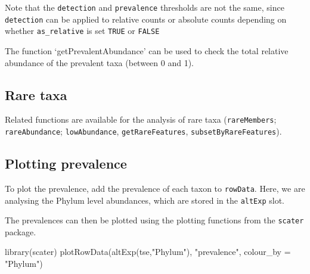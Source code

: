 \documentclass[
]{book}
\newenvironment{Shaded}{\begin{snugshade}}{\end{snugshade}}
\newcommand{\AttributeTok}[1]{\textcolor[rgb]{0.77,0.63,0.00}{#1}}
\newcommand{\ConstantTok}[1]{\textcolor[rgb]{0.00,0.00,0.00}{#1}}
\newcommand{\DecValTok}[1]{\textcolor[rgb]{0.00,0.00,0.81}{#1}}
\newcommand{\FunctionTok}[1]{\textcolor[rgb]{0.00,0.00,0.00}{#1}}
\newcommand{\NormalTok}[1]{#1}
\newcommand{\OtherTok}[1]{\textcolor[rgb]{0.56,0.35,0.01}{#1}}
\newcommand{\SpecialCharTok}[1]{\textcolor[rgb]{0.00,0.00,0.00}{#1}}
\newcommand{\StringTok}[1]{\textcolor[rgb]{0.31,0.60,0.02}{#1}}
\begin{document}
Note that the \texttt{detection} and \texttt{prevalence} thresholds are not the same, since
\texttt{detection} can be applied to relative counts or absolute counts depending on
whether \texttt{as\_relative} is set \texttt{TRUE} or \texttt{FALSE}

The function `getPrevalentAbundance' can be used to check the total
relative abundance of the prevalent taxa (between 0 and 1).

\hypertarget{rare-taxa}{%
\subsection{Rare taxa}\label{rare-taxa}}

Related functions are available for the analysis of rare taxa
(\texttt{rareMembers}; \texttt{rareAbundance}; \texttt{lowAbundance}, \texttt{getRareFeatures},
\texttt{subsetByRareFeatures}).

\hypertarget{plotting-prevalence}{%
\subsection{Plotting prevalence}\label{plotting-prevalence}}

To plot the prevalence, add the prevalence of each taxon to
\texttt{rowData}. Here, we are analysing the Phylum level abundances, which
are stored in the \texttt{altExp} slot.

\begin{Shaded}
\end{Shaded}

The prevalences can then be plotted using the plotting functions from
the \texttt{scater} package.

\begin{Shaded}
\begin{Highlighting}[]
\FunctionTok{library}\NormalTok{(scater)}
\FunctionTok{plotRowData}\NormalTok{(}\FunctionTok{altExp}\NormalTok{(tse,}\StringTok{"Phylum"}\NormalTok{), }\StringTok{"prevalence"}\NormalTok{, }\AttributeTok{colour\_by =} \StringTok{"Phylum"}\NormalTok{)}
\end{Highlighting}
\end{Shaded}
\end{document}
